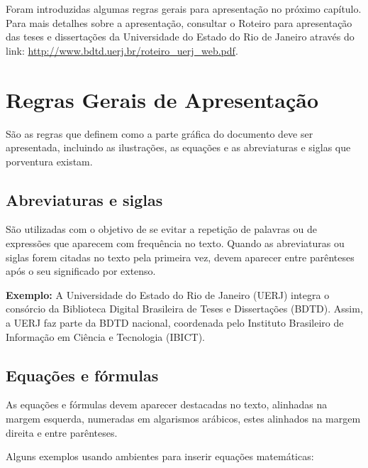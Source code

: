 \documentclass[a4paper,12pt,oneside,onecolumn,final,fleqn]{repUERJ}
\begin{document}
Foram introduzidas algumas regras gerais para apresentação no próximo capítulo. Para mais detalhes sobre a apresentação, consultar o Roteiro para apresentação das teses e dissertações da Universidade do Estado do Rio de Janeiro através do link: \url{http://www.bdtd.uerj.br/roteiro_uerj_web.pdf}.


\chapter{Regras Gerais de Apresentação}

São as regras que definem como a parte gráfica do documento
deve ser apresentada, incluindo as ilustrações, as equações e as abreviaturas e siglas que porventura existam.


\section{Abreviaturas e siglas}

São utilizadas com o objetivo de se evitar a repetição de palavras ou de expressões que aparecem com frequência no texto. Quando as abreviaturas ou siglas forem citadas no texto pela primeira vez, devem aparecer entre parênteses após o seu significado por extenso.

\textbf{Exemplo:} A Universidade do Estado do Rio de Janeiro (UERJ) integra o consórcio da Biblioteca Digital Brasileira de Teses e Dissertações (BDTD). Assim, a UERJ faz parte da BDTD nacional, coordenada pelo Instituto Brasileiro de Informação em Ciência e Tecnologia (IBICT).


\section{Equações e fórmulas}

As equações e fórmulas devem aparecer destacadas no texto, alinhadas na margem esquerda, numeradas em algarismos arábicos, estes
alinhados na margem direita e entre parênteses. 

Alguns exemplos usando ambientes para inserir equações matemáticas:
\end{document}
